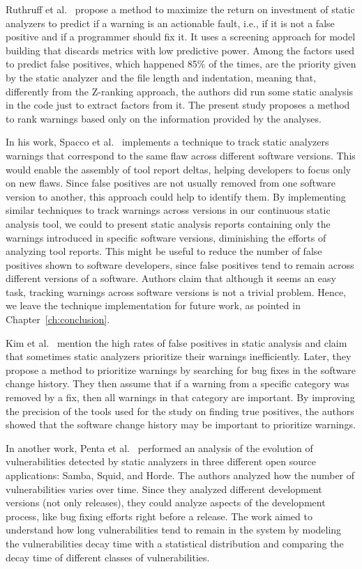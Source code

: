 Ruthruff et al.~\cite{ruthruff_predicting_2008} propose a method to maximize
the return on investment of static analyzers to predict if a warning is an
actionable fault, i.e., if it is not a false positive and if a programmer
should fix it. It uses a screening approach for model building that discards
metrics with low predictive power. Among the factors used to predict false
positives, which happened 85\% of the times, are the priority given by the
static analyzer and the file length and indentation, meaning that, differently
from the Z-ranking approach, the authors did run some static analysis in the
code just to extract factors from it. The present study proposes a method to
rank warnings based only on the information provided by the analyses.

In his work, Spacco et al.~\cite{spacco_tracking_2006} implements a technique
to track static analyzers warnings that correspond to the same flaw across
different software versions. This would enable the assembly of tool report
deltas, helping developers to focus only on new flaws. Since false positives
are not usually removed from one software version to another, this approach
could help to identify them. By implementing similar techniques to track
warnings across versions in our continuous static analysis tool, we could to
present static analysis reports containing only the warnings introduced in
specific software versions, diminishing the efforts of analyzing tool reports.
This might be useful to reduce the number of false positives shown to software
developers, since false positives tend to remain across different versions of a
software. Authors claim that although it seems an easy task, tracking warnings
across software versions is not a trivial problem. Hence, we leave the technique
implementation for future work, as pointed in Chapter~\ref{ch:conclusion}.

Kim et al.~\cite{kim_which_2007} mention the high rates of false positives in
static analysis and claim that sometimes static analyzers prioritize their
warnings inefficiently. Later, they propose a method to prioritize
warnings by searching for bug fixes in the software change history. They then
assume that if a warning from a specific category was removed by a fix, then
all warnings in that category are important. By improving the precision of the
tools used for the study on finding true positives, the authors showed that the
software change history may be important to prioritize warnings.

In another work, Penta et al.~\cite{penta_evolution_2008} performed an analysis
of the evolution of vulnerabilities detected by static analyzers in three
different open source applications: Samba, Squid, and Horde. The authors
analyzed how the number of vulnerabilities varies over time. Since they
analyzed different development versions (not only releases), they could analyze
aspects of the development process, like bug fixing efforts right before a
release. The work aimed to understand how long vulnerabilities tend
to remain in the system by modeling the vulnerabilities decay time with a
statistical distribution and comparing the decay time of different classes of
vulnerabilities.

